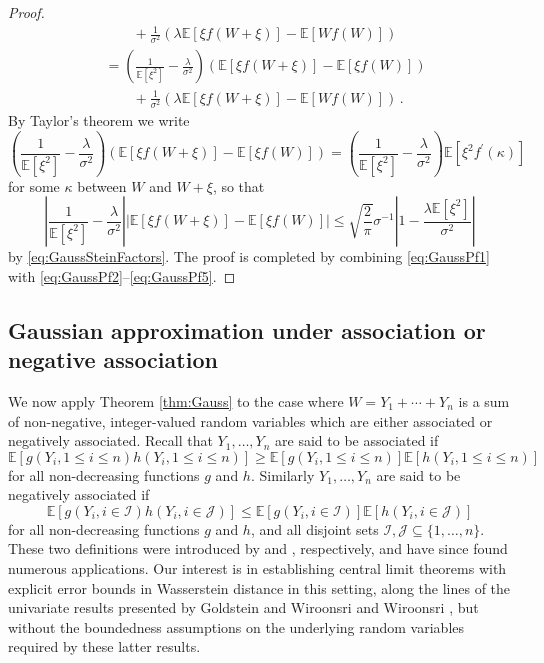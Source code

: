 \documentclass[12pt]{article}
\begin{document}
\begin{proof}
\begin{align}
\nonumber&\qquad+\frac{1}{\sigma^2}\left(\lambda\mathbb{E}[\xi f(W+\xi)]-\mathbb{E}[Wf(W)]\right)\\
\nonumber&=\left(\frac{1}{\mathbb{E}[\xi^2]}-\frac{\lambda}{\sigma^2}\right)\left(\mathbb{E}[\xi f(W+\xi)]-\mathbb{E}[\xi f(W)]\right)\\
&\qquad+\frac{1}{\sigma^2}\left(\lambda\mathbb{E}[\xi f(W+\xi)]-\mathbb{E}[Wf(W)]\right)\,.
\end{align}
By Taylor's theorem we write
\[
\left(\frac{1}{\mathbb{E}[\xi^2]}-\frac{\lambda}{\sigma^2}\right)\left(\mathbb{E}[\xi f(W+\xi)]-\mathbb{E}[\xi f(W)]\right)=\left(\frac{1}{\mathbb{E}[\xi^2]}-\frac{\lambda}{\sigma^2}\right)\mathbb{E}[\xi^2f^\prime(\kappa)]
\]
for some $\kappa$ between $W$ and $W+\xi$, so that
\begin{equation}\label{eq:GaussPf5}
\left|\frac{1}{\mathbb{E}[\xi^2]}-\frac{\lambda}{\sigma^2}\right|\left|\mathbb{E}[\xi f(W+\xi)]-\mathbb{E}[\xi f(W)]\right|\leq\sqrt{\frac{2}{\pi}}\sigma^{-1}\left|1-\frac{\lambda\mathbb{E}[\xi^2]}{\sigma^2}\right|
\end{equation}
by \eqref{eq:GaussSteinFactors}. The proof is completed by combining \eqref{eq:GaussPf1} with \eqref{eq:GaussPf2}--\eqref{eq:GaussPf5}.
\end{proof}

\subsection{Gaussian approximation under association or negative 
association}\label{subsec:normal_ass}

We now apply Theorem \ref{thm:Gauss} to the case where $W=Y_1+\cdots+Y_n$ is a sum of non-negative, integer-valued random variables which are either associated or negatively associated. Recall that $Y_1,\ldots,Y_n$ are said to be associated if 
\[
\mathbb{E}[g(Y_i,1\leq i\leq n)h(Y_i,1\leq i\leq n)]\geq\mathbb{E}[g(Y_i,1\leq i\leq n)]\mathbb{E}[h(Y_i,1\leq i\leq n)]
\]  
for all non-decreasing functions $g$ and $h$. Similarly $Y_1,\ldots,Y_n$ are said to be negatively associated if
\[
\mathbb{E}[g(Y_i,i\in\mathcal{I})h(Y_i,i\in\mathcal{J})]\leq\mathbb{E}[g(Y_i,i\in\mathcal{I})]\mathbb{E}[h(Y_i,i\in\mathcal{J})]
\]
for all non-decreasing functions $g$ and $h$, and all disjoint sets $\mathcal{I},\mathcal{J}\subseteq\{1,\ldots,n\}$. These two definitions were introduced by \cite{esary67} and \cite{joagdev83}, respectively, and have since found numerous applications. Our interest is in establishing central limit theorems with explicit error bounds in Wasserstein distance in this setting, along the lines of the univariate results presented by Goldstein and Wiroonsri \cite{goldstein18} and Wiroonsri \cite{wiroonsri18}, but without the boundedness assumptions on the underlying random variables required by these latter results.
\end{document}
